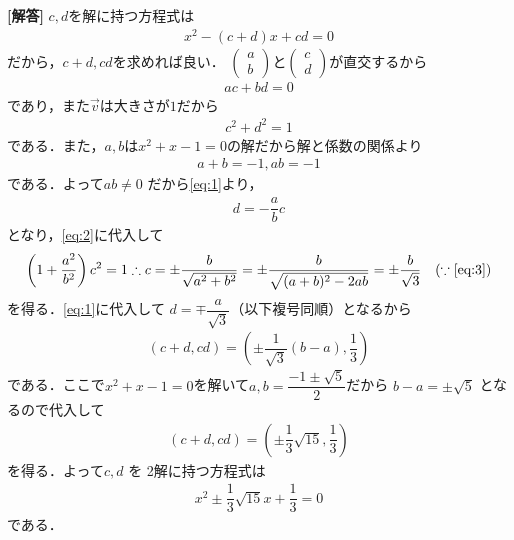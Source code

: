\documentclass[../../main.tex]{subfiles}
\begin{document}
\begin{oframed}
  
\end{oframed}

{\bf [解答]}
$c,d$を解に持つ方程式は
\begin{align}
  x^2 - (c+d)x + cd = 0
\end{align}
だから，$c+d,cd$を求めれば良い．
$
\begin{pmatrix} a \\ b
\end{pmatrix}$と$
\begin{pmatrix} c \\ d
\end{pmatrix}$が直交するから
\begin{align}
  ac + bd = 0 \label{eq:1}
\end{align}
であり，また$\vec{v}$は大きさが$1$だから
\begin{align}
  c^2 + d^2 = 1 \label{eq:2}
\end{align}
である．また，$a,b$は$x^2+x-1=0$の解だから解と係数の関係より
\begin{align}
  a+b = -1 , ab = -1 \label{eq:3}
\end{align}
である．よって$ab \neq 0$ だから\cref{eq:1}より，
\begin{align}
  d = -\dfrac{a}{b}c
\end{align}
となり，\cref{eq:2}に代入して
\begin{align}
  \left( 1 + \dfrac{a^2}{b^2} \right) c^2 = 1
  \therefore
  c = \pm \dfrac{b}{\sqrt{a^2+b^2}} = \pm \dfrac{b}{\sqrt{(a+b)^2-2ab}} = \pm\dfrac{b}{\sqrt{3}} \quad (\because\text{\cref{eq:3}})
\end{align}
を得る．\cref{eq:1}に代入して $d = \mp \dfrac{a}{\sqrt{3}}$（以下複号同順）となるから
\begin{align}
  (c+d, cd) = \left( \pm \dfrac{1}{\sqrt{3}}(b-a), \dfrac{1}{3} \right)
\end{align}
である．ここで$x^2+x-1=0$を解いて$a,b=\dfrac{-1 \pm \sqrt{5}}{2}$だから
$b-a = \pm \sqrt{5}$ となるので代入して
\begin{align}
  (c+d, cd) = \left( \pm \dfrac{1}{3}\sqrt{15}, \dfrac{1}{3} \right)
\end{align}
を得る．よって$c, d$ を 2解に持つ方程式は
\begin{align}
  x^2 \pm \dfrac{1}{3}\sqrt{15}x + \dfrac{1}{3} = 0
\end{align}
である．

\newpage
\end{document}
